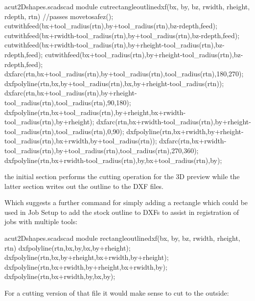 \documentclass{ltxdoc}
\begin{document}
\lstset{firstnumber=\thecuttwod}
\begin{writecode}{a}{cut2Dshapes.scad}{scad}
module cutrectangleoutlinedxf(bx, by, bz, rwidth, rheight, rdepth, rtn) {//passes
  movetosafez();
  cutwithfeed(bx+tool_radius(rtn),by+tool_radius(rtn),bz-rdepth,feed);
  cutwithfeed(bx+rwidth-tool_radius(rtn),by+tool_radius(rtn),bz-rdepth,feed);
  cutwithfeed(bx+rwidth-tool_radius(rtn),by+rheight-tool_radius(rtn),bz-rdepth,feed);
  cutwithfeed(bx+tool_radius(rtn),by+rheight-tool_radius(rtn),bz-rdepth,feed);
  dxfarc(rtn,bx+tool_radius(rtn),by+tool_radius(rtn),tool_radius(rtn),180,270);
  dxfpolyline(rtn,bx,by+tool_radius(rtn),bx,by+rheight-tool_radius(rtn));
  dxfarc(rtn,bx+tool_radius(rtn),by+rheight-tool_radius(rtn),tool_radius(rtn),90,180);
  dxfpolyline(rtn,bx+tool_radius(rtn),by+rheight,bx+rwidth-tool_radius(rtn),by+rheight);
  dxfarc(rtn,bx+rwidth-tool_radius(rtn),by+rheight-tool_radius(rtn),tool_radius(rtn),0,90);
  dxfpolyline(rtn,bx+rwidth,by+rheight-tool_radius(rtn),bx+rwidth,by+tool_radius(rtn));
  dxfarc(rtn,bx+rwidth-tool_radius(rtn),by+tool_radius(rtn),tool_radius(rtn),270,360);
  dxfpolyline(rtn,bx+rwidth-tool_radius(rtn),by,bx+tool_radius(rtn),by);
}

\end{writecode}
\addtocounter{cuttwod}{16}

\noindent the initial section performs the cutting operation for the 3D preview while the 
latter section writes out the outline to the DXF files.

%
Which suggests a further command for simply adding a rectangle which could be used in
Job Setup to add the stock outline to DXFs to assist in registration of jobs with
multiple tools:

\lstset{firstnumber=\thecuttwod}
\begin{writecode}{a}{cut2Dshapes.scad}{scad}
module rectangleoutlinedxf(bx, by, bz, rwidth, rheight, rtn) {
  dxfpolyline(rtn,bx,by,bx,by+rheight);
  dxfpolyline(rtn,bx,by+rheight,bx+rwidth,by+rheight);
  dxfpolyline(rtn,bx+rwidth,by+rheight,bx+rwidth,by);
  dxfpolyline(rtn,bx+rwidth,by,bx,by);
}

\end{writecode}
\addtocounter{cuttwod}{7}

%
For a cutting version of that file it would make sense to cut to the outside:
\end{document}
